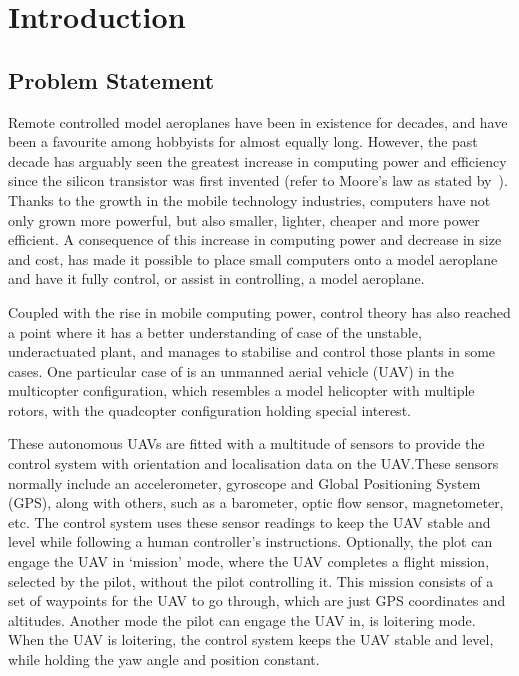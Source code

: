 \chapter{Introduction}

\section{Problem Statement}
\label{sec:problem-statement}

Remote controlled model aeroplanes have been in existence for decades, and have been a favourite among hobbyists for almost equally long. However, the past decade has arguably seen the greatest increase in computing power and efficiency since the silicon transistor was first invented (refer to Moore's law as stated by~\cite{moore2005cramming}). Thanks to the growth in the mobile technology industries, computers have not only grown more powerful, but also smaller, lighter, cheaper and more power efficient. A consequence of this increase in computing power and decrease in size and cost, has made it possible to place small computers onto a model aeroplane and have it fully control, or assist in controlling, a model aeroplane. 

Coupled with the rise in mobile computing power, control theory has also reached a point where it has a better understanding of case of the unstable, underactuated plant, and manages to stabilise and control those plants in some cases. One particular case  of is an unmanned aerial vehicle (UAV) in the multicopter configuration, which resembles a model helicopter with multiple rotors, with the quadcopter configuration holding special interest. 

These autonomous UAVs are fitted with a multitude of sensors to provide the control system with orientation and localisation data on the UAV.\@ These sensors normally include an accelerometer, gyroscope and Global Positioning System (GPS), along with others, such as a barometer, optic flow sensor, magnetometer, etc. The control system uses these sensor readings to keep the UAV stable and level while following a human controller's instructions. Optionally, the plot can engage the UAV in `mission' mode, where the UAV completes a flight mission, selected by the pilot, without the pilot controlling it. This mission consists of a set of waypoints for the UAV to go through, which are just GPS coordinates and altitudes. Another mode the pilot can engage the UAV in, is loitering mode. When the UAV is loitering, the control system keeps the UAV stable and level, while holding the yaw angle and position constant. 

